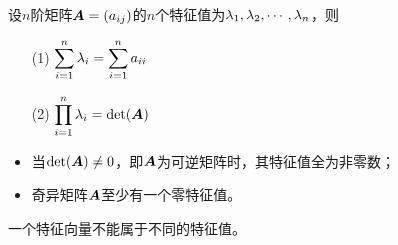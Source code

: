         \begin{frame}
          
          \begin{dingli}
            设$n$阶矩阵$\boldsymbol{A}=(a_{ij})$的$n$个特征值为$\lambda_1,\lambda_2,\cdots,\lambda_n$，则
            \begin{itemize}
            \item[(1)] $\displaystyle \sum_{i=1}^n\lambda_i=\sum_{i=1}^na_{ii}$
            \item[(2)] $\displaystyle \prod_{i=1}^n\lambda_i=\mathrm{det}(\boldsymbol{A})$         
            \end{itemize}
          \end{dingli}
          

          \begin{itemize}
          \item 当$\mathrm{det}(\boldsymbol{A})\ne 0$，即$\boldsymbol{A}$为可逆矩阵时，其特征值全为非零数；
          \item 奇异矩阵$\boldsymbol{A}$至少有一个零特征值。      
          \end{itemize}
          
        \end{frame}


        


        \begin{frame}
          
          \begin{dingli}
            一个特征向量不能属于不同的特征值。
          \end{dingli}
          
          
        \end{frame}

